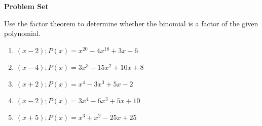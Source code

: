 \textbf{Problem Set}

\vspce

Use the factor theorem to determine whether the binomial is a factor of the given polynomial. 


\begin{enumerate}[label = \arabic*. ]

\item \hspce $(x-2); P(x) = x^{20}-4x^{18}+3x-6$
\vspce
\item \hspce $(x-4); P(x) = 3x^3-15x^2+10x+8$
\vspce
\item \hspce $(x+2); P(x) = x^4- 3x^3+5x-2$
\vspce
\item \hspce $(x-2); P(x) = 3x^4-6x^3+5x+10$
\vspce
\item \hspce $(x+5); P(x) = x^3+x^2-25x+25$


\end{enumerate}



 



